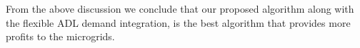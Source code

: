 \begin{itemize}
From the above discussion we conclude that our proposed algorithm along with the flexible ADL demand integration, is the best algorithm that provides more profits to the microgrids.
	
\end{itemize}

